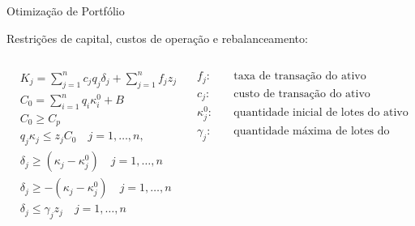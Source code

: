 





    \begin{frame}{Otimização de Portfólio}

        Restrições de capital, custos de operação e rebalanceamento:

        \begin{columns}
            \begin{column}{0.5\textwidth}

                \begin{subequations}
                    \label{eq:otimizacao_2}
                    \begin{align}
                        & K_{j} = \sum_{j=1}^{n}c_{j}q_{j}\delta_{j} + \sum_{j=1}^{n} f_{j} z_{j}   \\
                        & C_{0} = \sum_{i=1}^{n}q_{i}\kappa_{i}^{0}+ B \\
                        & C_{0} \geq C_{p} \\
                        &  q_{j}\kappa_{j} \leq z_{j} C_{0} \quad j=1, \ldots, n \text{,} \\
                        & \delta_{j} \geq \left( \kappa_{j} -\kappa_{j}^{0} \right) \quad j=1, \ldots, n \\
                        & \delta_{j} \geq -\left( \kappa_{j} -\kappa_{j}^{0} \right) \quad j=1, \ldots, n \\
                        & \delta_{j} \leq \gamma_{j}z_{j} \quad j=1, \ldots, n
                    \end{align}
                \end{subequations}
            \end{column}

            \begin{column}{0.5\textwidth}

                \begin{equation*}
                    \begin{aligned}
                        f_{j} : \quad & \text{taxa de transação do ativo} \\
                        c_{j} : \quad & \text{custo de transação do ativo} \\
                        \kappa_{j}^{0} : \quad & \text{quantidade inicial de lotes do ativo} \\
                        \gamma_{j} : \quad & \text{quantidade máxima de lotes do ativo}
                    \end{aligned}
                \end{equation*}

            \end{column}
        \end{columns}

    \end{frame}
